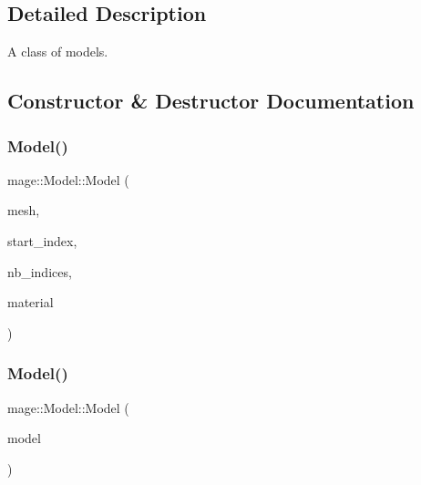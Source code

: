 \subsection{Detailed Description}
A class of models. 

\subsection{Constructor \& Destructor Documentation}
\hypertarget{classmage_1_1_model_aca2d5faa95a447ff3ecaab685aec8581}{}\label{classmage_1_1_model_aca2d5faa95a447ff3ecaab685aec8581} 
\subsubsection{\texorpdfstring{Model()}{Model()}\hspace{0.1cm}{\footnotesize\ttfamily [1/3]}}
{\footnotesize\ttfamily mage\+::\+Model\+::\+Model (\begin{DoxyParamCaption}\item[{\hyperlink{namespacemage_a1e01ae66713838a7a67d30e44c67703e}{Shared\+Ptr}$<$ const \hyperlink{classmage_1_1_mesh}{Mesh} $>$}]{mesh,  }\item[{size\+\_\+t}]{start\+\_\+index,  }\item[{size\+\_\+t}]{nb\+\_\+indices,  }\item[{const \hyperlink{structmage_1_1_shaded_material}{Shaded\+Material} \&}]{material }\end{DoxyParamCaption})\hspace{0.3cm}{\ttfamily [explicit]}}

\hypertarget{classmage_1_1_model_ac5f1d340bbfefd30bec3e6343a86059a}{}\label{classmage_1_1_model_ac5f1d340bbfefd30bec3e6343a86059a} 
\subsubsection{\texorpdfstring{Model()}{Model()}\hspace{0.1cm}{\footnotesize\ttfamily [2/3]}}
{\footnotesize\ttfamily mage\+::\+Model\+::\+Model (\begin{DoxyParamCaption}\item[{const \hyperlink{classmage_1_1_model}{Model} \&}]{model }\end{DoxyParamCaption})}

